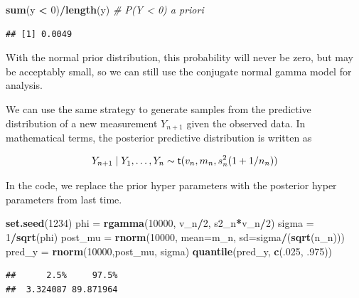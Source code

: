 \documentclass[]{book}
\newenvironment{Shaded}{\begin{snugshade}}{\end{snugshade}}
\newcommand{\KeywordTok}[1]{\textcolor[rgb]{0.13,0.29,0.53}{\textbf{#1}}}
\newcommand{\DataTypeTok}[1]{\textcolor[rgb]{0.13,0.29,0.53}{#1}}
\newcommand{\DecValTok}[1]{\textcolor[rgb]{0.00,0.00,0.81}{#1}}
\newcommand{\StringTok}[1]{\textcolor[rgb]{0.31,0.60,0.02}{#1}}
\newcommand{\CommentTok}[1]{\textcolor[rgb]{0.56,0.35,0.01}{\textit{#1}}}
\newcommand{\OperatorTok}[1]{\textcolor[rgb]{0.81,0.36,0.00}{\textbf{#1}}}
\newcommand{\NormalTok}[1]{#1}
\theoremstyle{definition}
\theoremstyle{definition}
\theoremstyle{definition}
\theoremstyle{remark}
\begin{document}
\begin{Shaded}
\begin{Highlighting}[]
\KeywordTok{sum}\NormalTok{(y }\OperatorTok{<}\StringTok{ }\DecValTok{0}\NormalTok{)}\OperatorTok{/}\KeywordTok{length}\NormalTok{(y)  }\CommentTok{# P(Y < 0) a priori}
\end{Highlighting}
\end{Shaded}

\begin{verbatim}
## [1] 0.0049
\end{verbatim}

With the normal prior distribution, this probability will never be zero,
but may be acceptably small, so we can still use the conjugate normal
gamma model for analysis.

We can use the same strategy to generate samples from the predictive
distribution of a new measurement \(Y_{n+1}\) given the observed data.
In mathematical terms, the posterior predictive distribution is written
as

\[Y_{n+1} \mid Y_1, \ldots, Y_n \sim \textsf{t}(v_n, m_n, s^2_n (1 + 1/n_n))\]

In the code, we replace the prior hyper parameters with the posterior
hyper parameters from last time.

\begin{Shaded}
\begin{Highlighting}[]
\KeywordTok{set.seed}\NormalTok{(}\DecValTok{1234}\NormalTok{)}
\NormalTok{phi =}\StringTok{ }\KeywordTok{rgamma}\NormalTok{(}\DecValTok{10000}\NormalTok{, v_n}\OperatorTok{/}\DecValTok{2}\NormalTok{, s2_n}\OperatorTok{*}\NormalTok{v_n}\OperatorTok{/}\DecValTok{2}\NormalTok{)}
\NormalTok{sigma =}\StringTok{ }\DecValTok{1}\OperatorTok{/}\KeywordTok{sqrt}\NormalTok{(phi)}
\NormalTok{post_mu =}\StringTok{ }\KeywordTok{rnorm}\NormalTok{(}\DecValTok{10000}\NormalTok{, }\DataTypeTok{mean=}\NormalTok{m_n, }\DataTypeTok{sd=}\NormalTok{sigma}\OperatorTok{/}\NormalTok{(}\KeywordTok{sqrt}\NormalTok{(n_n)))}
\NormalTok{pred_y =}\StringTok{  }\KeywordTok{rnorm}\NormalTok{(}\DecValTok{10000}\NormalTok{,post_mu, sigma)}
\KeywordTok{quantile}\NormalTok{(pred_y, }\KeywordTok{c}\NormalTok{(.}\DecValTok{025}\NormalTok{, .}\DecValTok{975}\NormalTok{))}
\end{Highlighting}
\end{Shaded}

\begin{verbatim}
##      2.5%     97.5% 
##  3.324087 89.871964
\end{verbatim}
\end{document}
